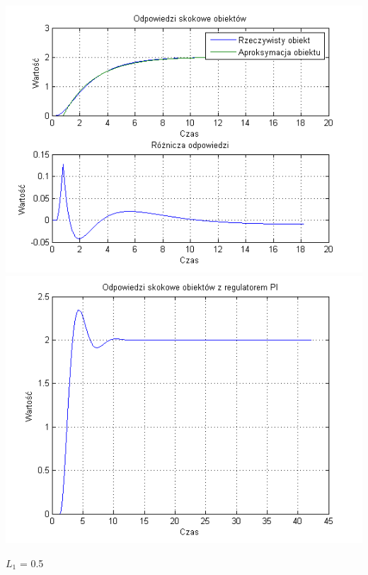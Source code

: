 \documentclass[10pt,a4paper]{article}
\begin{document}
\begin{center}
\includegraphics[scale=1]{images/jeden/skrypt_179.png}\\
\includegraphics[scale=1]{images/jeden/skrypt_180.png}\\
\end{center}
\newpage
$L_1$ = 0.5
\end{document}
